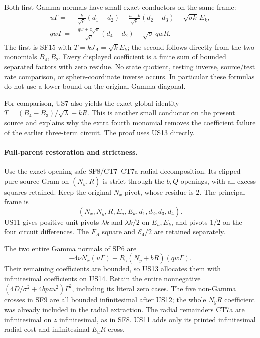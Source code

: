 Both first Gamma normals have small exact conductors on the same
frame:
\[
\boxed{\begin{aligned}
 u\Gamma={}&\frac{k}{\sqrt\rho}(d_1-d_2)
       -\frac{u-k}{\sqrt\rho}(d_2-d_3)
       -\sqrt{\sigma k}\,E_k,\\
 qw\Gamma={}&\frac{qw+z\sqrt\sigma}{\sqrt\rho}(d_4-d_2)
                         -\sqrt\sigma\,qwR.
\end{aligned}}\tag{US13}
\]
The first is SF15 with $T=kJ_A=\sqrt k E_k$; the second follows
directly from the two monomials $B_4,B_2$. Every displayed coefficient
is a finite sum of bounded separated factors with zero residue.
No state quotient, testing inverse, source/test rate comparison,
or sphere-coordinate inverse occurs. In particular these formulas
do not use a lower bound on the original Gamma diagonal.

For comparison, US7 also yields the exact global identity
$T=(B_4-B_3)/\sqrt\lambda-kR$. This is another small conductor
on the present source and explains why the extra fourth monomial
removes the coefficient failure of the earlier three-term circuit.
The proof uses US13 directly.

\paragraph{Full-parent restoration and strictness.}
Use the exact opening-safe SF8/CT7--CT7a radial decomposition. Its
clipped pure-source Gram on $(N_y,R)$ is strict through the $b,Q$
openings, with all excess squares retained. Keep the original
$N_x$ pivot, whose residue is $2$. The principal frame is
\[
           (N_x,N_y,R,E_u,E_k,d_1,d_2,d_3,d_4).
           \tag{US14}
\]
US11 gives positive-unit pivots $\lambda k$ and $\lambda k/2$
on $E_u,E_k$, and pivots $1/2$ on the four circuit differences.
The $F_A$ square and $\mathcal E_4/2$ are retained separately.

The two entire Gamma normals of SP6 are
\[
       -4\nu N_x(u\Gamma)
            +R_\gamma(N_y+bR)(qw\Gamma).
\]
Their remaining coefficients are bounded, so US13 allocates them
with infinitesimal coefficients on US14. Retain the entire
nonnegative $(4D/\sigma^2+4bpzu^2)\Gamma^2$, including its literal
zero cases. The five non-Gamma crosses in SF9 are all bounded
infinitesimal after US12; the whole $N_yR$ coefficient was already
included in the radial extraction. The radial remainders CT7a are
infinitesimal on $z$ infinitesimal, as in SF8. US11 adds only its
printed infinitesimal radial cost and infinitesimal $E_uR$ cross.

